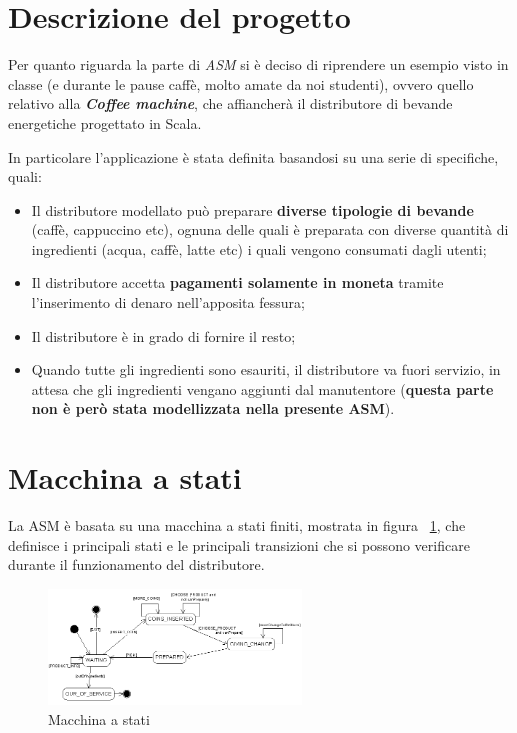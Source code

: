 \section{Descrizione del progetto}
Per quanto riguarda la parte di \textit{ASM} si è deciso di riprendere un esempio visto in classe (e durante le pause caffè, molto amate da noi studenti), ovvero quello relativo alla \textit{\textbf{Coffee machine}}, che affiancherà il distributore di bevande energetiche progettato in Scala.

In particolare l'applicazione è stata definita basandosi su una serie di specifiche, quali:
\begin{itemize}
	\item Il distributore modellato può preparare \textbf{diverse tipologie di bevande} (caffè, cappuccino etc), ognuna delle quali è preparata con diverse quantità di ingredienti (acqua, caffè, latte etc) i quali vengono consumati dagli utenti;
	\item Il distributore accetta \textbf{pagamenti solamente in moneta} tramite l'inserimento di denaro nell'apposita fessura;
	\item Il distributore è in grado di fornire il resto;
	\item Quando tutte gli ingredienti sono esauriti, il distributore va fuori servizio, in attesa che gli ingredienti vengano aggiunti dal manutentore (\textbf{questa parte non è però stata modellizzata nella presente ASM}).
\end{itemize}
	

\section{Macchina a stati}
La ASM è basata su una macchina a stati finiti, mostrata in figura ~\ref{fig:StateMachine}, che definisce i principali stati e le principali transizioni che si possono verificare durante il funzionamento del distributore. 
\begin{figure}[h!]
	\centering
	\includegraphics[width=0.6\textwidth]{Immagini/FSM.png}
	\caption{Macchina a stati}
	\label{fig:StateMachine}
\end{figure}

